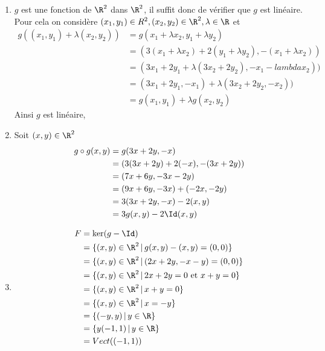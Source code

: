 \documentclass[a4paper, 11pt,reqno]{article}
\begin{document}
 
\begin{correction}
\begin{enumerate}
\item $g$ est une fonction de $\R^2$ dans $\R^2$, il suffit donc de vérifier que $g$ est linéaire. Pour cela on considère $(x_1,y_1)\in R^2,(x_2,y_2) \in \R^2, \lambda \in \R$ et 
\begin{align*}
g( (x_1,y_1) + \lambda (x_2,y_2))& = g( x_1 +\lambda x_2 , y_1 +\lambda y_2) \\
												&= (3(x_1 +\lambda x_2)  +2 (y_1 +\lambda y_2) , - (x_1 +\lambda x_2)) \\
												&= (3x_1 + 2y_1 +\lambda (3 x_2 +2y_2),  -x_1 -lambda x_2))\\
												&= (3x_1 + 2y_1, -x_1) +  \lambda (3 x_2 +2y_2,  -x_2))\\
												&= g(x_1,y_1) +\lambda g(x_2,y_2)
\end{align*}
Ainsi $g$ est linéaire, 
\item Soit $(x,y)\in \R^2$ 
\begin{align*}
g\circ g(x,y) &=g(3x+2y,-x)\\
					&= (3 (3x+2y) +2 (-x) , - (3x+2y))\\
					&=( 7x +6y, -3x-2y)\\
					&= (9x+6y, -3x) + (-2x,-2y)\\
					&= 3 (3x+2y,-x) -2(x,y)\\
					&= 3 g(x,y) - 2\Id (x,y)
\end{align*}

\item 
\begin{align*}
F&=\ker( g-\Id)\\
  &= \{ (x,y)\in \R^2\, |\, g(x,y)-(x,y) =(0,0)\}\\
  &= \{ (x,y)\in \R^2\, |\, (2x+2y,-x-y) =(0,0)\}\\
  &= \{ (x,y)\in \R^2\, |\, 2x+2y=0 \text{ et } x+y = 0 \}\\
  &= \{ (x,y)\in \R^2\, |\, x+y=0\}\\
  &= \{ (x,y)\in \R^2\, |\, x=-y\}\\
  &= \{ (-y,y)\, |\,y \in \R\}\\
  &=\{ y(-1,1)\, |\,y \in \R\}\\
  &= Vect(( -1,1))
\end{align*}


\end{enumerate}
\end{correction}
\end{document}
